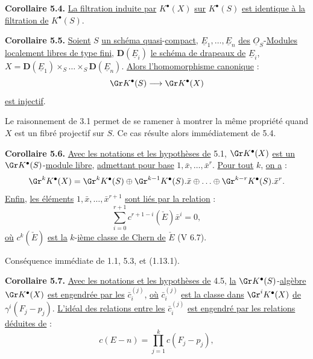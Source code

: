
\textbf{Corollaire 5.4.} \uline{La filtration induite par} $K^{\bullet}(X)$ \uline{sur} $K^{\bullet}(S)$ \uline{est identique à la filtration de} $K^{\bullet}(S)$.

\textbf{Corollaire 5.5.} \uline{Soient} $S$ \uline{un schéma quasi}-\uline{compact}, $\underline{E}_1,\ldots,\underline{E}_n$ \uline{des} $\underline{O}_S$-\uline{Modules} \uline{localement libres de type fini}, $\mathbf D(\underline{E}_i)$ \uline{le schéma de drapeaux de} $\underline{E}_i$, $X=\mathbf D(\underline{E}_1)\times_S\ldots\times_S \mathbf D(\underline{E}_n)$. \uline{Alors l'homomorphisme canonique} :
\[
  \Gr K^{\bullet}(S)\longrightarrow \Gr K^{\bullet}(X)
\]
\uline{est injectif}.

Le raisonnement de 3.1 permet de se ramener à montrer la même propriété quand $X$ est un fibré projectif sur $S$. Ce cas résulte alors immédiatement de 5.4.

\textbf{Corollaire 5.6.} \uline{Avec les notations et les hypothèses de} 5.1, $\Gr K^{\bullet}(X)$ \uline{est un} $\Gr K^{\bullet}(S)$-\uline{module libre}, \uline{admettant pour base} $1,\bar x,\ldots,\bar x^r$. \uline{Pour tout} $k$, \uline{on a} :
\[
  \Gr^kK^{\bullet}(X)=\Gr^kK^{\bullet}(S)\oplus \Gr^{k-1}K^{\bullet}(S).\bar x\oplus\ldots\oplus \Gr^{k-r}K^{\bullet}(S).\bar x^r .
\]
\uline{Enfin}, \uline{les éléments} $1,\bar x,\ldots,\bar x^{r+1}$ \uline{sont liés par la relation} :
\[
  \sum_{i=0}^{r+1}c^{r+1-i}(\check E)\bar x^i=0,
\]
\uline{où} $c^k(\check E)$ \uline{est la} $k$-\uline{ième classe de Chern de} $\check E$ (V 6.7).

Conséquence immédiate de 1.1, 5.3, et (1.13.1).

\textbf{Corollaire 5.7.} \uline{Avec les notations et les hypothèses de} 4.5, \uline{la} $\Gr K^{\bullet}(S)$-\uline{algèbre} $\Gr K^{\bullet}(X)$ \uline{est engendrée par les} $\bar c_i^{(j)}$, \uline{où} $\bar c_i^{(j)}$ \uline{est la classe dans} $\Gr^iK^{\bullet}(X)$ \uline{de} $\gamma^i(F_j-p_j)$. \uline{L'idéal des relations entre les} $\bar c_i^{(j)}$ \uline{est engendré par les relations déduites de} :
\[
  c(E-n)=\prod_{j=1}^{k}c(F_j-p_j),
\]
